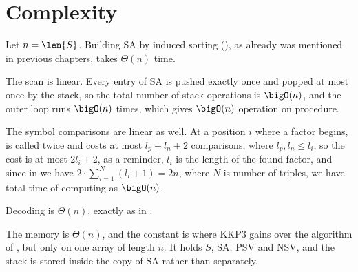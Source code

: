 \section{Complexity}
\label{sec:kkp-complexity}
Let \(n = \len{S}\). Building \(\mathrm{SA}\) by induced sorting (\cite{nong2009}), as already was mentioned in previous chapters, takes \(\Theta(n)\) time.

The scan is linear. Every entry of \(\mathrm{SA}\) is pushed exactly once and popped at most once by the stack, so the total number of stack operations is \(\bigO(n)\), and the outer loop runs \(\bigO(n)\) times, which gives \(\bigO(n)\) operation on  procedure.

The symbol comparisons are linear as well. At a position \(i\) where a factor begins,  is called twice and costs at most \(l_p + l_n + 2\) comparisons, where \(l_p, l_n \leq l_i\), so the cost is at most \(2 l_i + 2\), as a reminder, \(l_i\) is the length of the found factor, and since in  we have \(2\cdot\sum_{i=1}^N (l_i + 1) = 2n\), where \(N\) is number of triples, we have total time of  computing as \(\bigO(n)\). 

Decoding is \(\Theta(n)\), exactly as in .

The memory is \(\Theta(n)\), and the constant is where KKP3 gains over the algorithm of , but only on one array of length \(n\). It holds \(S\), \(\mathrm{SA}\), \(\mathrm{PSV}\) and \(\mathrm{NSV}\), and the stack is stored inside the copy of \(\mathrm{SA}\) rather than separately.
